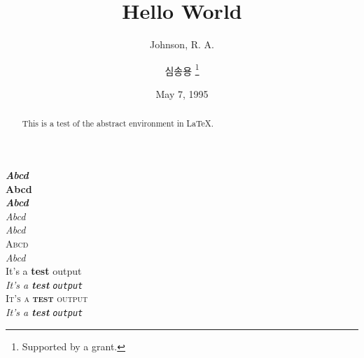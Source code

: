 \documentclass[11pt]{article}
\title{Hello World}
\author{Johnson, R. A. \and 심송용 \thanks{Supported by a grant.}}
\date{May 7, 1995}
\begin{document}
\maketitle

\begin{abstract}
This is a test of the abstract environment in \LaTeX.
\end{abstract}

{\bfseries\rmfamily\itshape Abcd} \\
{\bfseries\ttfamily\upshape Abcd} \\
{\bfseries\rmfamily\slshape Abcd} \\
{\mdseries\rmfamily\itshape Abcd} \\
{\mdseries\ttfamily\itshape Abcd} \\
{\mdseries\sffamily\scshape Abcd} \\
{\mdseries\sffamily\slshape Abcd} \\

\textup{It's a \textbf{test} \textrm{output}} \\
\textit{It's a \textbf{test} \texttt{output}} \\
\textsc{It's a \textbf{test} \textsf{output}} \\
\textsl{It's a \textbf{test} \texttt{output}}
\end{document}
